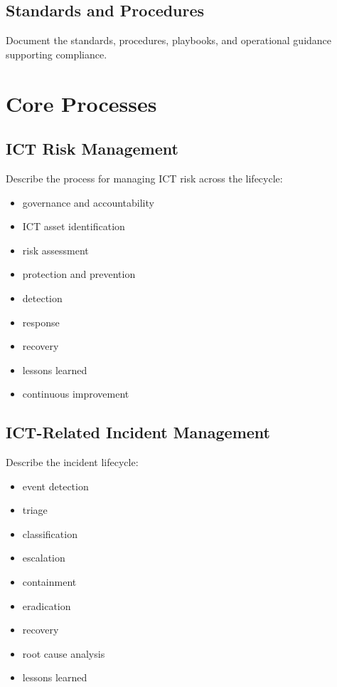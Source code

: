 \documentclass[
  letterpaper,
  DIV=11,
  numbers=noendperiod]{scrartcl}
\providecommand{\tightlist}{%
  \setlength{\itemsep}{0pt}\setlength{\parskip}{0pt}}
\begin{document}
\subsection{Standards and Procedures}\label{standards-and-procedures}

Document the standards, procedures, playbooks, and operational guidance
supporting compliance.

\section{Core Processes}\label{core-processes}

\subsection{ICT Risk Management}\label{ict-risk-management}

Describe the process for managing ICT risk across the lifecycle:

\begin{itemize}
\tightlist
\item
  governance and accountability
\item
  ICT asset identification
\item
  risk assessment
\item
  protection and prevention
\item
  detection
\item
  response
\item
  recovery
\item
  lessons learned
\item
  continuous improvement
\end{itemize}

\subsection{ICT-Related Incident
Management}\label{ict-related-incident-management}

Describe the incident lifecycle:

\begin{itemize}
\tightlist
\item
  event detection
\item
  triage
\item
  classification
\item
  escalation
\item
  containment
\item
  eradication
\item
  recovery
\item
  root cause analysis
\item
  lessons learned
\end{itemize}
\end{document}
